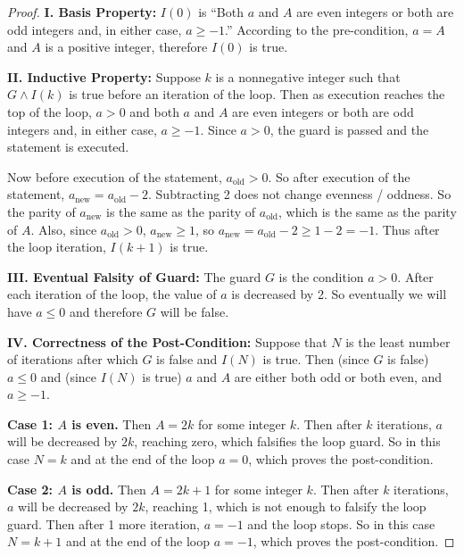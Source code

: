 \documentclass[14pt]{extarticle}
\begin{document}
\begin{proof}
    {\bf I. Basis Property:} $I(0)$ is ``Both $a$ and $A$ are even integers or both are odd integers and, in either case, $a \geq -1$.'' According to the pre-condition, $a = A$ and $A$ is a positive integer, therefore $I(0)$ is true.

        {\bf II. Inductive Property:} Suppose $k$ is a nonnegative integer such that $G \wedge I(k)$ is true before an
    iteration of the loop. Then as execution reaches the top of the loop, $a > 0$ and both $a$ and $A$ are even integers or
    both are odd integers and, in either case, $a \geq -1$. Since $a > 0$, the guard is passed and the statement is
    executed.

    Now before execution of the statement, $a_{\text{old}} > 0$. So after execution of the statement,
    $a_{\text{new}} = a_{\text{old}} - 2$. Subtracting 2 does not change evenness / oddness. So the parity of
    $a_{\text{new}}$ is the same as the parity of $a_{\text{old}}$, which is the same as the parity of $A$.
    Also, since $a_{\text{old}} > 0$, $a_{\text{new}} \geq 1$, so $a_{\text{new}} = a_{\text{old}} - 2 \geq 1 - 2 = -1$.
    Thus after the loop iteration, $I(k + 1)$ is true.

        {\bf III. Eventual Falsity of Guard:} The guard $G$ is the condition $a > 0$. After each iteration of the loop, the
    value of $a$ is decreased by 2. So eventually we will have $a \leq 0$ and therefore $G$ will be false.

        {\bf IV. Correctness of the Post-Condition:} Suppose that $N$ is the least number of iterations after which $G$ is false and $I(N)$ is true. Then (since $G$ is false) $a \leq 0$ and (since $I(N)$ is true) $a$ and $A$ are either both odd or both even, and $a \geq -1$.

        {\bf Case 1: $A$ is even.} Then $A = 2k$ for some integer $k$. Then after $k$ iterations, $a$ will be decreased by
    $2k$, reaching zero, which falsifies the loop guard. So in this case $N = k$ and at the end of the loop $a = 0$,
    which proves the post-condition.

    {\bf Case 2: $A$ is odd.} Then $A = 2k+1$ for some integer $k$. Then after $k$ iterations, $a$ will be decreased by
    $2k$, reaching 1, which is not enough to falsify the loop guard. Then after 1 more iteration, $a = -1$ and the loop
    stops. So in this case $N = k+1$ and at the end of the loop $a = -1$, which proves the post-condition.
\end{proof}
\end{document}
